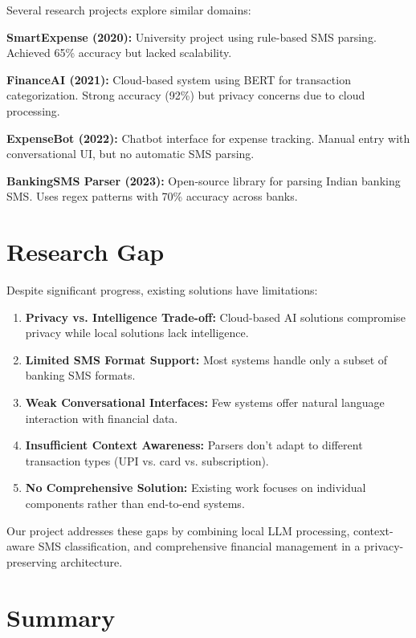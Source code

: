\documentclass[11pt,a4paper]{report}
\begin{document}
Several research projects explore similar domains:

\textbf{SmartExpense (2020):} University project using rule-based SMS parsing. Achieved 65\% accuracy but lacked scalability.

\textbf{FinanceAI (2021):} Cloud-based system using BERT for transaction categorization. Strong accuracy (92\%) but privacy concerns due to cloud processing.

\textbf{ExpenseBot (2022):} Chatbot interface for expense tracking. Manual entry with conversational UI, but no automatic SMS parsing.

\textbf{BankingSMS Parser (2023):} Open-source library for parsing Indian banking SMS. Uses regex patterns with 70\% accuracy across banks.

\section{Research Gap}

Despite significant progress, existing solutions have limitations:

\begin{enumerate}
    \item \textbf{Privacy vs. Intelligence Trade-off:} Cloud-based AI solutions compromise privacy while local solutions lack intelligence.
    
    \item \textbf{Limited SMS Format Support:} Most systems handle only a subset of banking SMS formats.
    
    \item \textbf{Weak Conversational Interfaces:} Few systems offer natural language interaction with financial data.
    
    \item \textbf{Insufficient Context Awareness:} Parsers don't adapt to different transaction types (UPI vs. card vs. subscription).
    
    \item \textbf{No Comprehensive Solution:} Existing work focuses on individual components rather than end-to-end systems.
\end{enumerate}

Our project addresses these gaps by combining local LLM processing, context-aware SMS classification, and comprehensive financial management in a privacy-preserving architecture.

\section{Summary}
\end{document}
